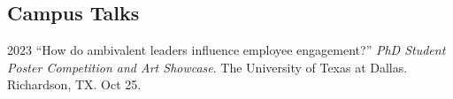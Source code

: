 \documentclass[11pt,letterpaper]{report} %
\begin{document}







    \subsection*{Campus Talks}

    \begin{tablist}


        \item[2023] \tab{}\enquote{How do ambivalent leaders influence employee engagement?} \textit{PhD Student Poster Competition and Art Showcase}. The University of Texas at Dallas. Richardson, TX. Oct 25.

    \end{tablist}





\end{document}
